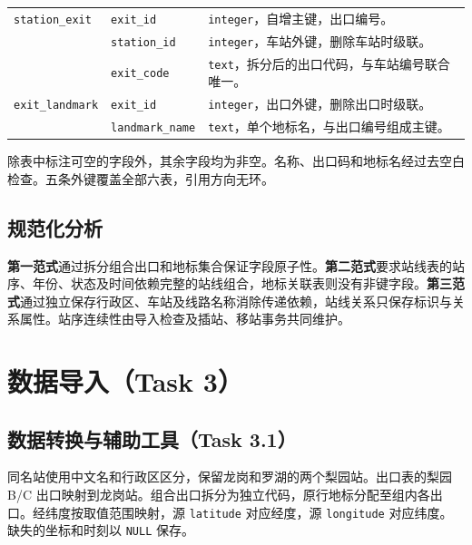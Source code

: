 \documentclass[UTF8,a4paper,11pt,fontset=fandol]{ctexart}
\newcommand{\code}[1]{\texttt{#1}}
\begin{document}
\begin{center}
\begin{tabularx}{\linewidth}{@{}L{28mm}L{28mm}Y@{}}
\addlinespace
\textcolor{ReportBlue}{\code{station\_exit}} & \code{exit\_id} & \code{integer}，自增主键，出口编号。\\
 & \code{station\_id} & \code{integer}，车站外键，删除车站时级联。\\
 & \code{exit\_code} & \code{text}，拆分后的出口代码，与车站编号联合唯一。\\
\addlinespace
\textcolor{ReportBlue}{\code{exit\_landmark}} & \code{exit\_id} & \code{integer}，出口外键，删除出口时级联。\\
 & \code{landmark\_name} & \code{text}，单个地标名，与出口编号组成主键。\\
\bottomrule
\end{tabularx}
\end{center}

除表中标注可空的字段外，其余字段均为非空。名称、出口码和地标名经过去空白检查。五条外键覆盖全部六表，引用方向无环。

\subsection{规范化分析}

\textbf{第一范式}通过拆分组合出口和地标集合保证字段原子性。\textbf{第二范式}要求站线表的站序、年份、状态及时间依赖完整的站线组合，地标关联表则没有非键字段。\textbf{第三范式}通过独立保存行政区、车站及线路名称消除传递依赖，站线关系只保存标识与关系属性。站序连续性由导入检查及插站、移站事务共同维护。

\clearpage
\section{数据导入（Task 3）}

\subsection{数据转换与辅助工具（Task 3.1）}

同名站使用中文名和行政区区分，保留龙岗和罗湖的两个梨园站。出口表的梨园 B/C 出口映射到龙岗站。组合出口拆分为独立代码，原行地标分配至组内各出口。经纬度按取值范围映射，源 \code{latitude} 对应经度，源 \code{longitude} 对应纬度。缺失的坐标和时刻以 \code{NULL} 保存。
\end{document}
